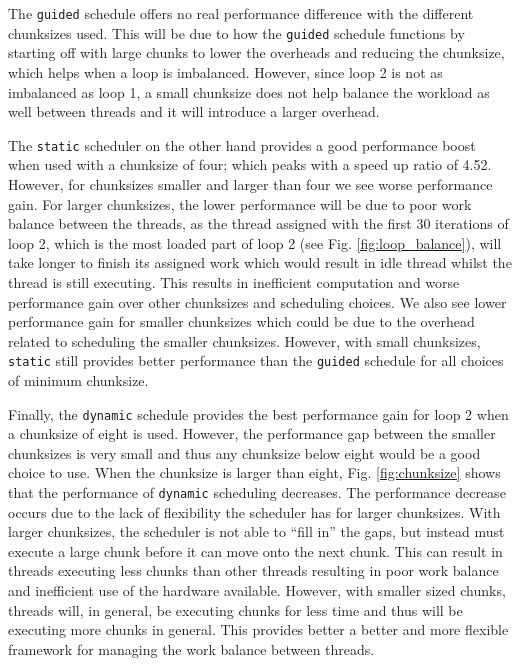 \documentclass[11pt, a4paper]{article}
\begin{document}
				The \texttt{guided} schedule offers no real performance difference with the different chunksizes used. This will be due to how the \texttt{guided} schedule functions by starting off with large chunks to lower the overheads and reducing the chunksize, which helps when a loop is imbalanced. However, since loop 2 is not as imbalanced as loop 1, a small chunksize does not help balance the workload as well between threads and it will introduce a larger overhead.
				
				The \texttt{static} scheduler on the other hand provides a good performance boost when used with a chunksize of four; which peaks with a speed up ratio of 4.52. However, for chunksizes smaller and larger than four we see worse performance gain. For larger chunksizes, the lower performance will be due to poor work balance between the threads, as the thread assigned with the first 30 iterations of loop 2, which is the most loaded part of loop 2 (see Fig. \ref{fig:loop_balance}), will take longer to finish its assigned work which would result in idle thread whilst the thread is still executing. This results in inefficient computation and worse performance gain over other chunksizes and scheduling choices. We also see lower performance gain for smaller chunksizes which could be due to the overhead related to scheduling the smaller chunksizes. However, with small chunksizes, \texttt{static} still provides better performance than the \texttt{guided} schedule for all choices of minimum chunksize.
											
				Finally, the \texttt{dynamic} schedule provides the best performance gain for loop 2 when a chunksize of eight is used. However, the performance gap between the smaller chunksizes is very small and thus any chunksize below eight would be a good choice to use. When the chunksize is larger than eight, Fig. \ref{fig:chunksize} shows that the performance of \texttt{dynamic} scheduling decreases. The performance decrease occurs due to the lack of flexibility the scheduler has for larger chunksizes.  With larger chunksizes, the scheduler is not able to ``fill in'' the gaps, but instead must execute a large chunk before it can move onto the next chunk. This can result in threads executing less chunks than other threads resulting in poor work balance and inefficient use of the hardware available. However, with smaller sized chunks, threads will, in general, be executing chunks for less time and thus will be executing more chunks in general. This provides better a better and more flexible framework for managing the work balance between threads.
							
\end{document}
